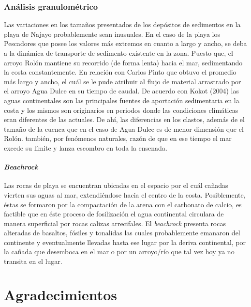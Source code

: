 \documentclass[11pt,]{article}
\begin{document}
\subsubsection{Análisis
granulométrico}\label{anuxe1lisis-granulomuxe9trico-1}

Las variaciones en los tamaños presentados de los depósitos de
sedimentos en la playa de Najayo probablemente sean inusuales. En el
caso de la playa los Pescadores que posee los valores más extremos en
cuanto a largo y ancho, se deba a la dinámica de transporte de sedimento
existente en la zona. Puesto que, el arroyo Rolón mantiene su recorrido
(de forma lenta) hacia el mar, sedimentando la costa constantemente. En
relación con Carlos Pinto que obtuvo el promedio más largo y ancho, el
cuál se le pude atribuir al flujo de material arrastrado por el arroyo
Agua Dulce en su tiempo de caudal. De acuerdo con Kokot (2004) las aguas
continentales son las principales fuentes de aportación sedimentaria en
la costa y los mismos son originarios en periodos donde las condiciones
climáticas eran diferentes de las actuales. De ahí, las diferencias en
los clastos, además de el tamaño de la cuenca que en el caso de Agua
Dulce es de menor dimensión que el Rolón. también, por fenómenos
naturales, razón de que en ese tiempo el mar excede su límite y lanza
escombro en toda la ensenada.

\paragraph{\texorpdfstring{\emph{Beachrock}}{Beachrock}}\label{beachrock}

Las rocas de playa se encuentran ubicadas en el espacio por el cuál
cañadas vierten sus aguas al mar, extendiéndose hacia el centro de la
costa. Posiblemente, éstas se formaron por la compactación de la arena
con el carbonato de calcio, es factible que en éste proceso de
fosilización el agua continental circulara de manera superficial por
rocas calizas arrecifales. El \emph{beachrock} presenta rocas alteradas
de basaltos, fósiles y tonalidas las cuales probablemente emanaron del
continente y eventualmente llevadas hasta ese lugar por la deriva
continental, por la cañada que desemboca en el mar o por un arroyo/río
que tal vez hoy ya no transita en el lugar.

\section{Agradecimientos}\label{agradecimientos}
\end{document}

